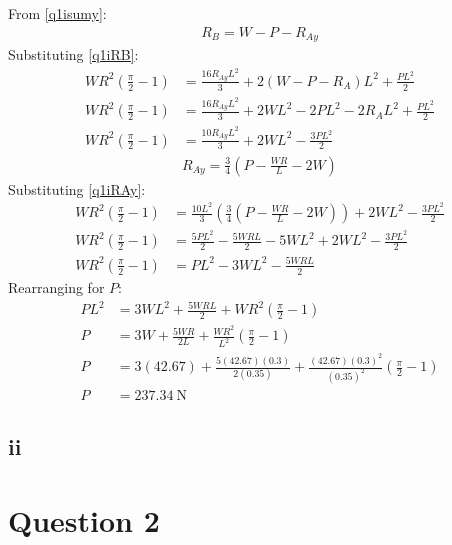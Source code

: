 \documentclass[11pt]{article}
\numberwithin{equation}{section}
\begin{document}
From \ref{q1isumy}:
\begin{align}
    R_B = W - P - R_{Ay} \label{q1iRB}
\end{align}
Substituting \ref{q1iRB}:
\begin{align}
    WR^2\left(\frac{\pi}{2}-1\right) &= \frac{16R_{Ay}L^2}{3} + 2\left(W - P - R_A\right)L^2 + \frac{PL^2}{2}\\
    WR^2\left(\frac{\pi}{2}-1\right) &= \frac{16R_{Ay}L^2}{3} + 2WL^2 - 2PL^2 - 2R_AL^2 + \frac{PL^2}{2}\\
    WR^2\left(\frac{\pi}{2}-1\right) &= \frac{10R_{Ay}L^2}{3} + 2WL^2 -\frac{3PL^2}{2}
\end{align}
\begin{align}
    R_{Ay} = \frac{3}{4}\left(P - \frac{WR}{L} - 2W\right) \label{q1iRAy}
\end{align}
Substituting \ref{q1iRAy}:
\begin{align}
    WR^2\left(\frac{\pi}{2}-1\right) &= \frac{10L^2}{3}\left(\frac{3}{4}\left(P - \frac{WR}{L} - 2W\right)\right) + 2WL^2 - \frac{3PL^2}{2}\\
    WR^2\left(\frac{\pi}{2}-1\right) &= \frac{5PL^2}{2} - \frac{5WRL}{2} - 5WL^2 + 2WL^2 - \frac{3PL^2}{2}\\
    WR^2\left(\frac{\pi}{2}-1\right) &= PL^2 - 3WL^2 - \frac{5WRL}{2}
\end{align}
Rearranging for $P$:
\begin{align}
    PL^2 &= 3WL^2 + \frac{5WRL}{2} + WR^2 \left(\frac{\pi}{2}-1\right)\\
    P &= 3W + \frac{5WR}{2L} + \frac{WR^2}{L^2} \left(\frac{\pi}{2}-1\right)\\
    P &= 3(42.67) + \frac{5(42.67)(0.3)}{2(0.35)} + \frac{(42.67)(0.3)^2}{(0.35)^2} \left(\frac{\pi}{2}-1\right)\\
    P &= \SI{237.34}{\newton}
\end{align}
\subsection{ii}
\section{Question 2}
\end{document}

